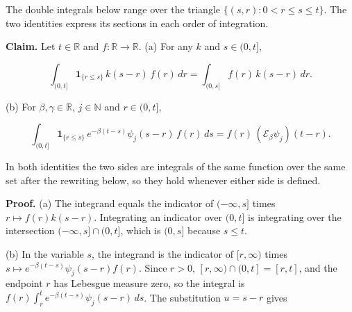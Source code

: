 \documentclass[11pt,a4paper]{article}
\begin{document}
The double integrals below range over the triangle \(\{(s,r):0<r\le s\le t\}\). The two identities express its sections in each order of integration.




\textbf{Claim.} Let \(t\in\mathbb R\) and \(f:\mathbb R\to\mathbb R\). (a) For any \(k\) and \(s\in(0,t]\),


\[\int_{(0,t]}\mathbf 1_{\{r\le s\}}\,k(s-r)\,f(r)\,dr=\int_{(0,s]}f(r)\,k(s-r)\,dr.\]


(b) For \(\beta,\gamma\in\mathbb R\), \(j\in\mathbb N\) and \(r\in(0,t]\),


\[\int_{(0,t]}\mathbf 1_{\{r\le s\}}\,e^{-\beta(t-s)}\psi_j(s-r)\,f(r)\,ds=f(r)\,(\mathcal E_\beta\psi_j)(t-r).\]


In both identities the two sides are integrals of the same function over the same set after the rewriting below, so they hold whenever either side is defined.




\textbf{Proof.} (a) The integrand equals the indicator of \((-\infty,s]\) times \(r\mapsto f(r)k(s-r)\). Integrating an indicator over \((0,t]\) is integrating over the intersection \((-\infty,s]\cap(0,t]\), which is \((0,s]\) because \(s\le t\).




(b) In the variable \(s\), the integrand is the indicator of \([r,\infty)\) times \(s\mapsto e^{-\beta(t-s)}\psi_j(s-r)f(r)\). Since \(r>0\), \([r,\infty)\cap(0,t]=[r,t]\), and the endpoint \(r\) has Lebesgue measure zero, so the integral is \(f(r)\int_r^te^{-\beta(t-s)}\psi_j(s-r)\,ds\). The substitution \(u=s-r\) gives
\end{document}
